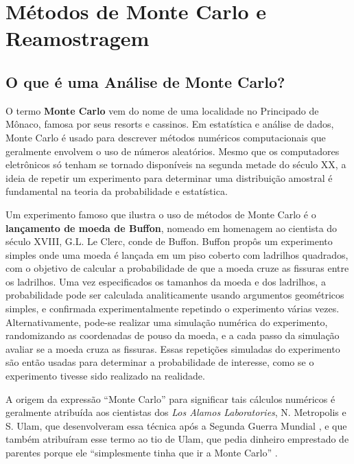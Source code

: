 \chapter{Métodos de Monte Carlo e Reamostragem}

\section{O que é uma Análise de Monte Carlo?}

O termo \textbf{Monte Carlo} vem do nome de uma localidade no Principado de Mônaco, famosa por seus resorts e cassinos. Em estatística e análise de dados, Monte Carlo é usado para descrever métodos numéricos computacionais que geralmente envolvem o uso de números aleatórios. Mesmo que os computadores eletrônicos só tenham se tornado disponíveis na segunda metade do século XX, a ideia de repetir um experimento para determinar uma distribuição amostral é fundamental na teoria da probabilidade e estatística. 

Um experimento famoso que ilustra o uso de métodos de Monte Carlo é o \textbf{lançamento de moeda de Buffon}, nomeado em homenagem ao cientista do século XVIII, G.L. Le Clerc, conde de Buffon. Buffon propôs um experimento simples onde uma moeda é lançada em um piso coberto com ladrilhos quadrados, com o objetivo de calcular a probabilidade de que a moeda cruze as fissuras entre os ladrilhos. Uma vez especificados os tamanhos da moeda e dos ladrilhos, a probabilidade pode ser calculada analiticamente usando argumentos geométricos simples, e confirmada experimentalmente repetindo o experimento várias vezes. Alternativamente, pode-se realizar uma simulação numérica do experimento, randomizando as coordenadas de pouso da moeda, e a cada passo da simulação avaliar se a moeda cruza as fissuras. Essas repetições simuladas do experimento são então usadas para determinar a probabilidade de interesse, como se o experimento tivesse sido realizado na realidade.

A origem da expressão ``Monte Carlo'' para significar tais cálculos numéricos é geralmente atribuída aos cientistas dos \textit{Los Alamos Laboratories}, N. Metropolis e S. Ulam, que desenvolveram essa técnica após a Segunda Guerra Mundial \citep{metropolis1949}, e que também atribuíram esse termo ao tio de Ulam, que pedia dinheiro emprestado de parentes porque ele ``simplesmente tinha que ir a Monte Carlo'' \citep{metropolis1953}. 

